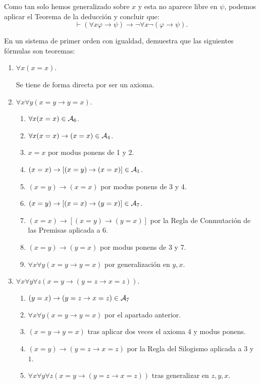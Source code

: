 \begin{ejercicio}
    Como tan solo hemos generalizado sobre $x$ y esta no aparece libre en $\psi$, podemos aplicar el Teorema de la deducción y concluir que:
    \begin{equation*}
        \vdash (\forall x \varphi \rightarrow \psi) \rightarrow \neg\forall x \neg(\varphi \rightarrow \psi).
    \end{equation*}
\end{ejercicio}



\begin{ejercicio}
    En un sistema de primer orden con igualdad, demuestra que las siguientes fórmulas son teoremas:
    \begin{enumerate}
        \item $\forall x (x = x)$.
        
        Se tiene de forma directa por ser un axioma.
        \item $\forall x \forall y (x = y \rightarrow y = x)$.
        \begin{enumerate}[label=\arabic*.]
            \item $\forall x(x=x)\in \mathcal{A}_6$.
            \item $\forall x(x=x)\to (x=x)\in \mathcal{A}_4$.
            \item $x=x$ por modus ponens de 1 y 2.
            \item $(x=x)\to [(x=y)\to (x=x)]\in \mathcal{A}_1$.
            \item $(x=y)\to (x=x)$ por modus ponens de 3 y 4.
            \item $(x=y)\to [(x=x)\to (y=x)]\in \mathcal{A}_7$.
            \item $(x=x)\to [(x=y)\to (y=x)]$ por la Regla de Conmutación de las Premisas aplicada a 6.
            \item $(x=y)\to (y=x)$ por modus ponens de 3 y 7.
            \item $\forall x\forall y (x=y\to y=x)$ por generalización en $y,x$.
        \end{enumerate}
        
        \item $\forall x \forall y \forall z (x = y \rightarrow (y = z \rightarrow x = z))$.
        \begin{enumerate}[label=\arabic*.]
            \item $(y = x) \rightarrow (y = z \rightarrow x = z)\in \mathcal{A}_7$
            \item $\forall x\forall y (x=y\to y=x)$ por el apartado anterior.
            \item $(x=y\to y=x)$ tras aplicar dos veces el axioma $4$ y modus ponens.
            \item $(x = y) \rightarrow (y = z \rightarrow x = z)$ por la Regla del Silogismo aplicada a $3$ y $1$.
            \item $\forall x \forall y \forall z (x = y \rightarrow (y = z \rightarrow x = z))$ tras generalizar en $z,y,x$.
        \end{enumerate}
    \end{enumerate}
\end{ejercicio}

